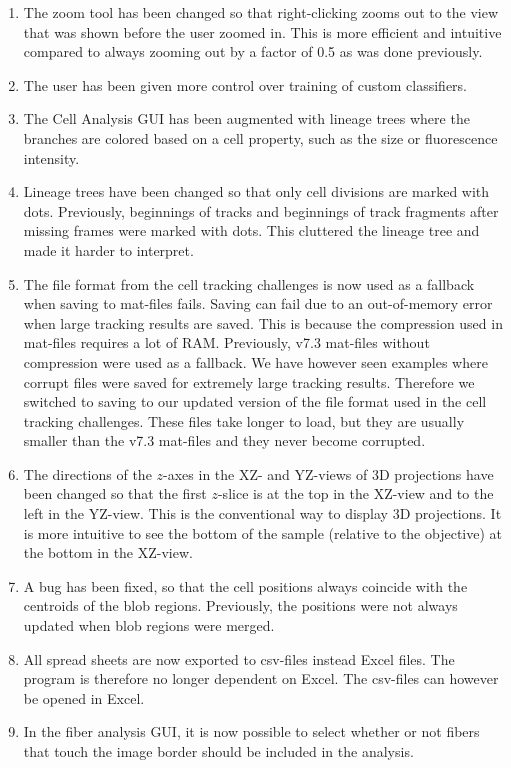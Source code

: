 \documentclass[a4paper, oneside, onecolumn, 11pt]{article}
\begin{document}
\begin{enumerate}
\item The zoom tool has been changed so that right-clicking zooms out to the view that was shown before the user zoomed in. This is more efficient and intuitive compared to always zooming out by a factor of 0.5 as was done previously.
\item The user has been given more control over training of custom classifiers.
\item The Cell Analysis GUI has been augmented with lineage trees where the branches are colored based on a cell property, such as the size or fluorescence intensity.
\item Lineage trees have been changed so that only cell divisions are marked with dots. Previously, beginnings of tracks and beginnings of track fragments after missing frames were marked with dots. This cluttered the lineage tree and made it harder to interpret.
\item The file format from the cell tracking challenges is now used as a fallback when saving to mat-files fails. Saving can fail due to an out-of-memory error when large tracking results are saved. This is because the compression used in mat-files requires a lot of RAM. Previously, v7.3 mat-files without compression were used as a fallback. We have however seen examples where corrupt files were saved for extremely large tracking results. Therefore we switched to saving to our updated version of the file format used in the cell tracking challenges. These files take longer to load, but they are usually smaller than the v7.3 mat-files and they never become corrupted.
\item The directions of the $z$-axes in the XZ- and YZ-views of 3D projections have been changed so that the first $z$-slice is at the top in the XZ-view and to the left in the YZ-view. This is the conventional way to display 3D projections. It is more intuitive to see the bottom of the sample (relative to the objective) at the bottom in the XZ-view.
\item A bug has been fixed, so that the cell positions always coincide with the centroids of the blob regions. Previously, the positions were not always updated when blob regions were merged.
\item All spread sheets are now exported to csv-files instead Excel files. The program is therefore no longer dependent on Excel. The csv-files can however be opened in Excel.
\item In the fiber analysis GUI, it is now possible to select whether or not fibers that touch the image border should be included in the analysis.

\end{enumerate}
\end{document}
